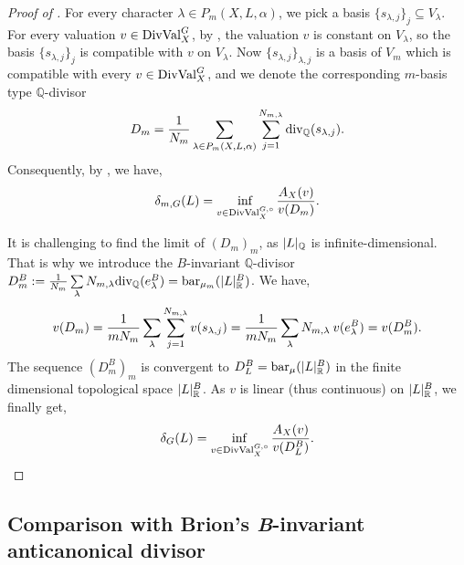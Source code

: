 \begin{proof}[Proof of ]
	For every character $\lambda \in P_m(X, L, \alpha)$, we pick a basis $\{s_{\lambda, j}\}_j \subseteq V_\lambda$. For every valuation $v \in \mathrm{DivVal}^G_X$, by , the valuation $v$ is constant on $V_\lambda$, so the basis $\{s_{\lambda, j}\}_j$ is compatible with $v$ on $V_\lambda$. Now $\{s_{\lambda, j}\}_{\lambda, j}$ is a basis of $V_m$ which is compatible with every $v \in \mathrm{DivVal}^G_X$, and we denote the corresponding $m$-basis type $\mathbb{Q}$-divisor
	\begin{equation*}
		D_m = {1 \over N_m} \sum_{\lambda \in P_m(X, L, \alpha)} \sum_{j = 1}^{N_{m, \lambda}} \divQ(s_{\lambda, j}).
	\end{equation*}
	Consequently, by , we have,
	\begin{equation*}
		\delta_{m, G}(L) = \inf_{v \in \GDValo_X} {A_X(v) \over v(D_m)}.
	\end{equation*}

	It is challenging to find the limit of $(D_m)_m$, as $\mathopen{}\left|L\right|\mathclose{}_\mathbb{Q}$ is infinite-dimensional. That is why we introduce the $B$-invariant $\mathbb{Q}$-divisor  $D^B_m := {1 \over N_m} \sum_\lambda N_{m, \lambda} \divQ(e^B_\lambda) = \bc_{\mu_m}(\Rls{L}^B)$. We have,
	\begin{equation*}
		v(D_m) = {1 \over m N_m} \sum_\lambda \sum_{j = 1}^{N_{m, \lambda}} v(s_{\lambda, j}) = {1 \over m N_m} \sum_\lambda N_{m, \lambda} \: v(e^B_\lambda) = v(D^B_m).
	\end{equation*}
	The sequence $(D^B_m)_m$ is convergent to $D^B_L = \mathrm{bar}_{\mu}(\mathopen{}\left|L\right|\mathclose{}_\mathbb{R}^B)$ in the finite dimensional topological space $\mathopen{}\left|L\right|\mathclose{}_\mathbb{R}^B$. As $v$ is linear (thus continuous) on $\mathopen{}\left|L\right|\mathclose{}_\mathbb{R}^B$, we finally get,
	\begin{equation*}
		\delta_G(L) = \inf_{v \in \GDValo_X} {A_X(v) \over v(D^B_L)}.
	\end{equation*}
\end{proof}

\subsection{Comparison with Brion's \textit{B}-invariant anticanonical divisor}\label{sec:KstSph:Brion}


